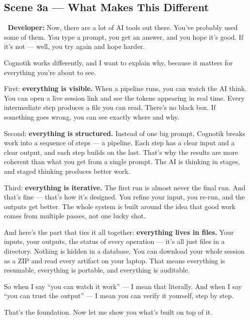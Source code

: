 \documentclass[12pt, letterpaper]{article}
\newcommand{\dev}{\textbf{\color{cogblue}\faIcon{laptop-code}\ Developer:}}
\begin{document}
  \subsection{Scene 3a — What Makes This Different}

  \begin{developerbox}
    \dev{} Now, there are a lot of AI tools out there. You've probably used some
    of them. You type a prompt, you get an answer, and you hope it's good. If it's
    not — well, you try again and hope harder.

    \medskip
    Cognotik works differently, and I want to explain why, because it matters for
    everything you're about to see.

    \medskip
    First: \textbf{everything is visible.} When a pipeline runs, you can watch the
    AI think. You can open a live session link and see the tokens appearing in real
    time. Every intermediate step produces a file you can read. There's no black
    box. If something goes wrong, you can see exactly where and why.

    \medskip
    Second: \textbf{everything is structured.} Instead of one big prompt, Cognotik
    breaks work into a sequence of steps — a pipeline. Each step has a clear input
    and a clear output, and each step builds on the last. That's why the results
    are more coherent than what you get from a single prompt. The AI is thinking in
    stages, and staged thinking produces better work.

    \medskip
    Third: \textbf{everything is iterative.} The first run is almost never the
    final run. And that's fine — that's how it's designed. You refine your input,
    you re-run, and the outputs get better. The whole system is built around the
    idea that good work comes from multiple passes, not one lucky shot.

    \medskip
    And here's the part that ties it all together: \textbf{everything lives in
    files.} Your inputs, your outputs, the status of every operation — it's all
    just files in a directory. Nothing is hidden in a database. You can download
    your whole session as a ZIP and read every artifact on your laptop. That means
    everything is resumable, everything is portable, and everything is auditable.

    \medskip
    So when I say ``you can watch it work'' — I mean that literally. And when I say
    ``you can trust the output'' — I mean you can verify it yourself, step by step.

    \medskip
    That's the foundation. Now let me show you what's built on top of it.
  \end{developerbox}
\end{document}
